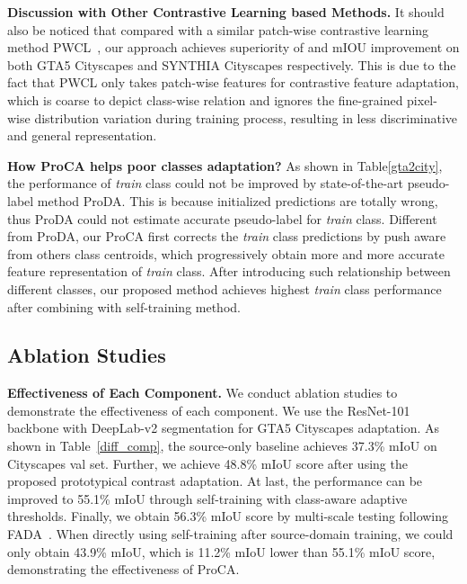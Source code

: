 \documentclass[runningheads]{llncs}
\begin{document}
\noindent \textbf{Discussion with Other Contrastive Learning based Methods.}
It should also be noticed that compared with a similar patch-wise contrastive learning method PWCL~\cite{liu2021domain}, our approach achieves superiority of  and  mIOU improvement on both GTA5  Cityscapes and SYNTHIA  Cityscapes respectively.
This is due to the fact that PWCL only takes patch-wise features for contrastive feature adaptation, which is coarse to depict class-wise relation and ignores the fine-grained pixel-wise distribution variation during training process, resulting in less discriminative and general representation.


\noindent \textbf{How ProCA helps poor classes adaptation?} As shown in Table\ref{gta2city}, the performance of \emph{train} class could not be improved by state-of-the-art pseudo-label method ProDA. This is because initialized predictions are totally wrong, thus ProDA could not estimate accurate pseudo-label for \emph{train} class. Different from ProDA, our ProCA first corrects the \emph{train} class predictions by push aware from others class centroids, which progressively obtain more and more accurate feature representation of \emph{train} class. After introducing such relationship between different classes, our proposed method achieves highest \emph{train} class performance after combining with self-training method.



\subsection{Ablation Studies}

\noindent \textbf{Effectiveness of Each Component.} We conduct ablation studies to demonstrate the effectiveness of each component. We use the ResNet-101 backbone with DeepLab-v2 segmentation for GTA5  Cityscapes adaptation. As shown in Table~\ref{diff_comp}, the source-only baseline achieves 37.3\% mIoU on Cityscapes val set. Further, we achieve 48.8\% mIoU score after using the proposed prototypical contrast adaptation. At last, the performance can be improved to 55.1\% mIoU through self-training with class-aware adaptive thresholds. Finally, we obtain 56.3\% mIoU score by multi-scale testing following FADA~\cite{wang2020classes}. When directly using self-training after source-domain training, we could only obtain 43.9\% mIoU, which is 11.2\% mIoU lower than 55.1\% mIoU score, demonstrating the effectiveness of ProCA. 
\end{document}
